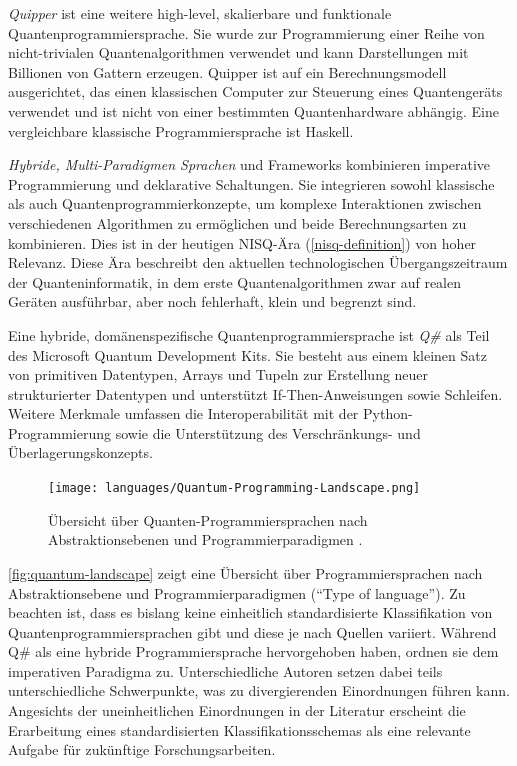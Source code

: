 \textit{Quipper} ist eine weitere high-level, skalierbare und funktionale Quantenprogrammiersprache. Sie wurde zur Programmierung einer Reihe von nicht-trivialen Quantenalgorithmen verwendet und kann Darstellungen mit Billionen von Gattern erzeugen. Quipper ist auf ein Berechnungsmodell ausgerichtet, das einen klassischen Computer zur Steuerung eines Quantengeräts verwendet und ist nicht von einer bestimmten Quantenhardware abhängig. \autocite{green_quipper_2013} Eine vergleichbare klassische Programmiersprache ist Haskell.

\textit{Hybride, Multi-Paradigmen Sprachen} und Frameworks kombinieren imperative Programmierung und deklarative Schaltungen. Sie integrieren sowohl klassische als auch Quantenprogrammierkonzepte, um komplexe Interaktionen zwischen verschiedenen Algorithmen zu ermöglichen und beide Berechnungsarten zu kombinieren. Dies ist in der heutigen NISQ-Ära (\autoref{nisq-definition}) von hoher Relevanz. Diese Ära beschreibt den aktuellen technologischen Übergangszeitraum der Quanteninformatik, in dem erste Quantenalgorithmen zwar auf realen Geräten ausführbar, aber noch fehlerhaft, klein und begrenzt sind. 

Eine hybride, domänenspezifische Quantenprogrammiersprache ist \textit{Q\#} als Teil des Microsoft Quantum Development Kits. Sie besteht aus einem kleinen Satz von primitiven Datentypen, Arrays und Tupeln zur Erstellung neuer strukturierter Datentypen und unterstützt If-Then-Anweisungen sowie Schleifen. Weitere Merkmale umfassen die Interoperabilität mit der Python-Programmierung sowie die Unterstützung des Verschränkungs- und Überlagerungskonzepts. \autocite{garhwal_quantum_2021}

\begin{figure}[ht!]
    \centering
    \texttt{[image: languages/Quantum-Programming-Landscape.png]}
    \caption{Übersicht über Quanten-Programmiersprachen nach Abstraktionsebenen und Programmierparadigmen \autocite[][]{serrano_quantum_2023}.}
    \label{fig:quantum-landscape}
\end{figure}

\autoref{fig:quantum-landscape} zeigt eine Übersicht über Programmiersprachen nach Abstraktionsebene und Programmierparadigmen (\enquote{Type of language}). Zu beachten ist, dass es bislang keine einheitlich standardisierte Klassifikation von Quantenprogrammiersprachen gibt und diese je nach Quellen variiert. Während \citeauthor{garhwal_quantum_2021} Q\# als eine hybride Programmiersprache hervorgehoben haben, ordnen \citeauthor{serrano_quantum_2023} sie dem imperativen Paradigma zu. 
Unterschiedliche Autoren setzen dabei teils unterschiedliche Schwerpunkte, was zu divergierenden Einordnungen führen kann. Angesichts der uneinheitlichen Einordnungen in der Literatur erscheint die Erarbeitung eines standardisierten Klassifikationsschemas als eine relevante Aufgabe für zukünftige Forschungsarbeiten.

